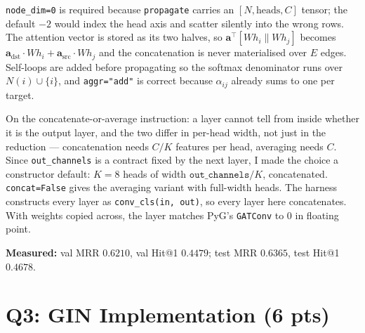 \noindent
\texttt{node\_dim=0} is required because \texttt{propagate} carries an
$[N, \text{heads}, C]$ tensor; the default $-2$ would index the head axis and scatter
silently into the wrong rows. The attention vector is stored as its two halves, so
$\mathbf{a}^\top[Wh_i \| Wh_j]$ becomes $\mathbf{a}_{\text{dst}}\!\cdot\!Wh_i +
\mathbf{a}_{\text{src}}\!\cdot\!Wh_j$ and the concatenation is never materialised over
$E$ edges. Self-loops are added before propagating so the softmax denominator runs over
$N(i)\cup\{i\}$, and \texttt{aggr="add"} is correct because $\alpha_{ij}$ already sums
to one per target.

On the concatenate-or-average instruction: a layer cannot tell from inside whether it
is the output layer, and the two differ in per-head width, not just in the reduction
--- concatenation needs $C/K$ features per head, averaging needs $C$. Since
\texttt{out\_channels} is a contract fixed by the next layer, I made the choice a
constructor default: $K=8$ heads of width $\texttt{out\_channels}/K$, concatenated.
\texttt{concat=False} gives the averaging variant with full-width heads. The harness
constructs every layer as \texttt{conv\_cls(in, out)}, so every layer here
concatenates. With weights copied across, the layer matches PyG's \texttt{GATConv} to
$0$ in floating point.

\medskip\noindent
\textbf{Measured:} val MRR $0.6210$, val Hit@1 $0.4479$; test MRR $0.6365$,
test Hit@1 $0.4678$.

\section*{Q3: GIN Implementation (6 pts)}

